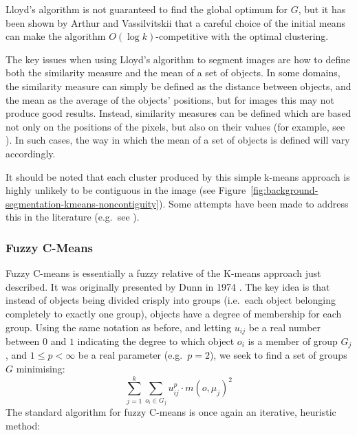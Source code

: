 \noindent Lloyd's algorithm is not guaranteed to find the global optimum for $G$, but it has been shown by Arthur and Vassilvitskii \cite{arthur07} that a careful choice of the initial means can make the algorithm $O(\log k)$-competitive with the optimal clustering.

The key issues when using Lloyd's algorithm to segment images are how to define both the similarity measure and the mean of a set of objects. In some domains, the similarity measure can simply be defined as the distance between objects, and the mean as the average of the objects' positions, but for images this may not produce good results. Instead, similarity measures can be defined which are based not only on the positions of the pixels, but also on their values (for example, see \cite{?}). In such cases, the way in which the mean of a set of objects is defined will vary accordingly.

It should be noted that each cluster produced by this simple k-means approach is highly unlikely to be contiguous in the image (see Figure~\ref{fig:background-segmentation-kmeans-noncontiguity}). Some attempts have been made to address this in the literature (e.g.~see \cite{luo03,ilea06}).

\subsubsection{Fuzzy C-Means}

Fuzzy C-means is essentially a fuzzy relative of the K-means approach just described. It was originally presented by Dunn in 1974 \cite{dunn74}. The key idea is that instead of objects being divided crisply into groups (i.e.~each object belonging completely to exactly one group), objects have a degree of membership for each group. Using the same notation as before, and letting $u_{ij}$ be a real number between $0$ and $1$ indicating the degree to which object $o_i$ is a member of group $G_j$, and $1 \le p < \infty$ be a real parameter (e.g.~$p = 2$), we seek to find a set of groups $G$ minimising:
%
\[
\sum_{j=1}^k \sum_{o_i \in G_j} u_{ij}^p \cdot m(o,\mu_j)^2
\]
%
The standard algorithm for fuzzy C-means is once again an iterative, heuristic method:

